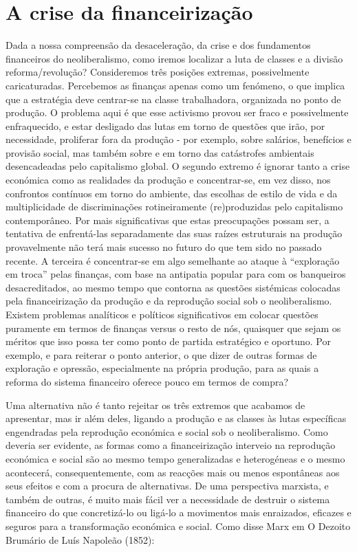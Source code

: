 \section{A crise da financeirização}
 \par 
Dada a nossa compreensão da desaceleração, da crise e dos fundamentos financeiros do neoliberalismo, como iremos localizar a luta de classes e a divisão reforma/revolução? Consideremos três posições extremas, possivelmente caricaturadas. Percebemos as finanças apenas como um fenómeno, o que implica que a estratégia deve centrar-se na classe trabalhadora, organizada no ponto de produção. O problema aqui é que esse activismo provou ser fraco e possivelmente enfraquecido, e estar desligado das lutas em torno de questões que irão, por necessidade, proliferar fora da produção - por exemplo, sobre salários, benefícios e provisão social, mas também sobre e em torno das catástrofes ambientais desencadeadas pelo capitalismo global. O segundo extremo é ignorar tanto a crise económica como as realidades da produção e concentrar-se, em vez disso, nos confrontos contínuos em torno do ambiente, das escolhas de estilo de vida e da multiplicidade de discriminações rotineiramente (re)produzidas pelo capitalismo contemporâneo. Por mais significativas que estas preocupações possam ser, a tentativa de enfrentá-las separadamente das suas raízes estruturais na produção provavelmente não terá mais sucesso no futuro do que tem sido no passado recente. A terceira é concentrar-se em algo semelhante ao ataque à “exploração em troca” pelas finanças, com base na antipatia popular para com os banqueiros desacreditados, ao mesmo tempo que contorna as questões sistémicas colocadas pela financeirização da produção e da reprodução social sob o neoliberalismo. Existem problemas analíticos e políticos significativos em colocar questões puramente em termos de finanças versus o resto de nós, quaisquer que sejam os méritos que isso possa ter como ponto de partida estratégico e oportuno. Por exemplo, e para reiterar o ponto anterior, o que dizer de outras formas de exploração e opressão, especialmente na própria produção, para as quais a reforma do sistema financeiro oferece pouco em termos de compra?
 \par 
Uma alternativa não é tanto rejeitar os três extremos que acabamos de apresentar, mas ir além deles, ligando a produção e as classes às lutas específicas engendradas pela reprodução económica e social sob o neoliberalismo. Como deveria ser evidente, as formas como a financeirização interveio na reprodução económica e social são ao mesmo tempo generalizadas e heterogéneas e o mesmo acontecerá, consequentemente, com as reacções mais ou menos espontâneas aos seus efeitos e com a procura de alternativas. De uma perspectiva marxista, e também de outras, é muito mais fácil ver a necessidade de destruir o sistema financeiro do que concretizá-lo ou ligá-lo a movimentos mais enraizados, eficazes e seguros para a transformação económica e social. Como disse Marx em O Dezoito Brumário de Luís Napoleão (1852):
